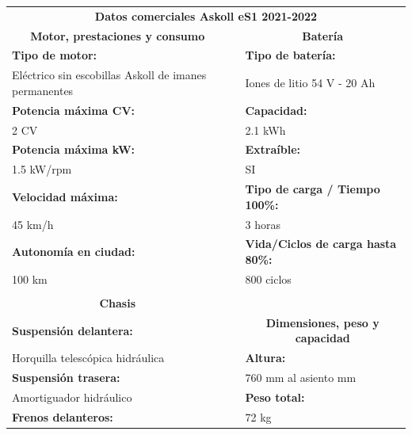 \begin{table}[H]
\centering
\begin{tabular}{lll}
\multicolumn{3}{c}{\textbf{Datos comerciales Askoll eS1 2021-2022}}                \\\cline{1-3}
\multicolumn{1}{c}{\textbf{Motor, prestaciones y consumo}} &  & \multicolumn{1}{c}{\textbf{Batería}}                       \\ \cline{1-1} \cline{3-3} 
\textbf{Tipo de motor:}             &  & \textbf{Tipo de batería:}                 \\
Eléctrico sin escobillas Askoll de imanes permanentes      &  & Iones de litio 54 V - 20 Ah                                \\
\textbf{Potencia máxima CV:}        &  & \textbf{Capacidad:}                       \\
2 CV                                &  & 2.1 kWh                                   \\
\textbf{Potencia máxima kW:}        &  & \textbf{Extraíble:}                       \\
1.5 kW/rpm                          &  & SI                                        \\
\textbf{Velocidad máxima:}          &  & \textbf{Tipo de carga / Tiempo 100\%:}    \\
45 km/h                             &  & 3 horas                                   \\
\textbf{Autonomía en ciudad:}       &  & \textbf{Vida/Ciclos de carga hasta 80\%:} \\
100 km                              &  & 800 ciclos                                \\
\multicolumn{1}{c}{\textbf{}}       &  &                                           \\
\multicolumn{1}{c}{\textbf{Chasis}} &  &                                           \\ \cline{1-1}
\textbf{Suspensión delantera:}                             &  & \multicolumn{1}{c}{\textbf{Dimensiones, peso y capacidad}} \\ \cline{3-3} 
Horquilla telescópica hidráulica    &  & \textbf{Altura:}                          \\
\textbf{Suspensión trasera:}        &  & 760 mm al asiento mm                      \\
Amortiguador hidráulico             &  & \textbf{Peso total:}                      \\
\textbf{Frenos delanteros:}         &  & 72 kg                                     \\

\end{tabular}
\end{table}
